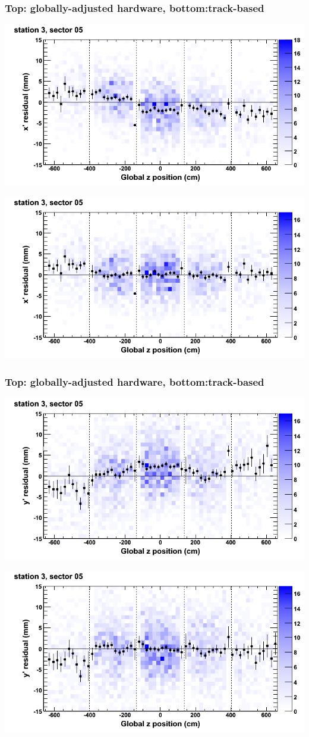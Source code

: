 \documentclass[compress]{beamer}
\begin{document}
\begin{frame}
\frametitle{Top: globally-adjusted hardware, bottom:track-based}
\includegraphics[width=0.7\linewidth]{NOV4_mapplots_HW/DTvsz_st3sec05_x.png}

\includegraphics[width=0.7\linewidth]{NOV4_mapplots/DTvsz_st3sec05_x.png}
\end{frame}

\begin{frame}
\frametitle{Top: globally-adjusted hardware, bottom:track-based}
\includegraphics[width=0.7\linewidth]{NOV4_mapplots_HW/DTvsz_st3sec05_y.png}

\includegraphics[width=0.7\linewidth]{NOV4_mapplots/DTvsz_st3sec05_y.png}
\end{frame}
\end{document}
